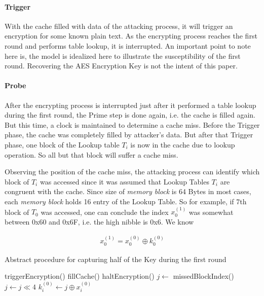 \paragraph{Trigger}
With the cache filled with data of the attacking process, it will trigger an encryption for some known plain text. As the encrypting process reaches the first round and performs table lookup, it is interrupted. An important point to note here is, the model is idealized here to illustrate the susceptibility of the first round. Recovering the AES Encryption Key is not the intent of this paper.

\paragraph{Probe}
After the encrypting process is interrupted just after it performed a table lookup during the first round, the Prime step is done again, i.e. the cache is filled again. But this time, a clock is maintained to determine a cache miss. Before the Trigger phase, the cache was completely filled by attacker's data. But after that Trigger phase, one block of the 
Lookup table $T_i$ is now in the cache due to lookup operation. So all but that block will suffer a cache miss.

Observing the position of the cache miss, the attacking process can identify which block of $T_i$ was accessed since it was assumed that Lookup Tables $T_i$ are congruent with the cache. Since size of \emph{memory block} is 64 Bytes in most cases, each \emph{memory block} holds 16 entry of the Lookup Table. So for example, if 7th block of $T_0$ was accessed, one can conclude the index $x_0^{(1)}$ was somewhat between 0x60 and 0x6F, i.e. the high nibble is 0x6. We know

\begin{align*}
x_0^{(1)}=x_0^{(0)} \oplus k_0^{(0)}
\end{align*}

\begin{algorithm}
\caption{Abstract procedure for capturing half of the Key during the first round}
\label{Abstract procedure for capturing half of the Key during the First Round}
\begin{algorithmic}[1]
	\State triggerEncryption()
		\State fillCache()
		\State haltEncryption()
		\State $j \gets$ missedBlockIndex()
		\State $j \gets j\ll 4$
		\State $k_i^{(0)} \gets j \oplus x_i^{(0)}$
	\EndFor
\end{algorithmic}
\end{algorithm}

